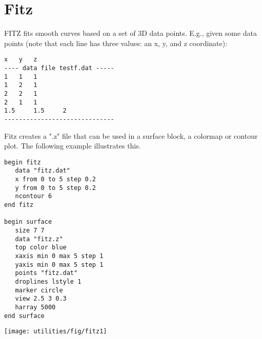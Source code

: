\section{Fitz}
 \label{fitz:sec}

{\sf FITZ} fits smooth curves based on a set of 3D data points. E.g., given some data points (note that each line has three values: an x, y, and z coordinate):
\begin{verbatim}
x	y	z
---- data file testf.dat -----
1 	1 	1
1 	2 	1
2 	2	1
2 	1	1
1.5 	1.5 	2
------------------------------
\end{verbatim}

Fitz creates a ".z" file that can be used in a surface block, a colormap or contour plot. The following example illustrates this.

\begin{minipage}[c]{8cm}
\begin{Verbatim}
begin fitz
   data "fitz.dat"
   x from 0 to 5 step 0.2
   y from 0 to 5 step 0.2
   ncontour 6
end fitz

begin surface
   size 7 7
   data "fitz.z"
   top color blue
   xaxis min 0 max 5 step 1
   yaxis min 0 max 5 step 1
   points "fitz.dat"
   droplines lstyle 1
   marker circle
   view 2.5 3 0.3
   harray 5000
end surface
\end{Verbatim}
\end{minipage}
\hfill
\begin{minipage}[c]{7cm}
\mbox{\texttt{[image: utilities/fig/fitz1]}}
\end{minipage}
